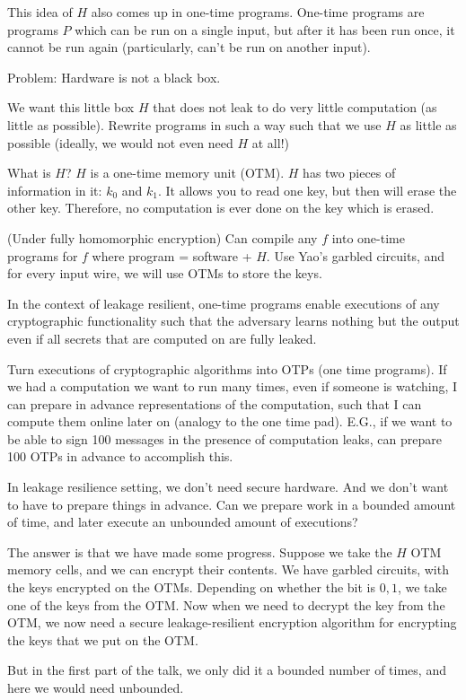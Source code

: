 \documentclass[10pt]{article}
\begin{document}
This idea of $H$ also comes up in one-time programs. One-time programs are programs $P$ which can be run on a single input, but after it has been run once, it cannot be run again (particularly, can't be run on another input).

Problem: Hardware is not a black box.

We want this little box $H$ that does not leak to do very little computation (as little as possible). Rewrite programs in such a way such that we use $H$ as little as possible (ideally, we would not even need $H$ at all!)

What is $H$? $H$ is a one-time memory unit (OTM). $H$ has two pieces of information in it: $k_0$ and $k_1$. It allows you to read one key, but then will erase the other key. Therefore, no computation is ever done on the key which is erased.

\begin{theorem}
(Under fully homomorphic encryption) Can compile any $f$ into one-time programs for $f$ where program = software + $H$. Use Yao's garbled circuits, and for every input wire, we will use OTMs to store the keys.
\end{theorem}

In the context of leakage resilient, one-time programs enable executions of any cryptographic functionality such that the adversary learns nothing but the output even if all secrets that are computed on are fully leaked.

Turn executions of cryptographic algorithms into OTPs (one time programs). If we had a computation we want to run many times, even if someone is watching, I can prepare in advance representations of the computation, such that I can compute them online later on (analogy to the one time pad). E.G., if we want to be able to sign 100 messages in the presence of computation leaks, can prepare 100 OTPs in advance to accomplish this.

In leakage resilience setting, we don't need secure hardware. And we don't want to have to prepare things in advance. Can we prepare work in a bounded amount of time, and later execute an unbounded amount of executions?

The answer is that we have made some progress. Suppose we take the $H$ OTM memory cells, and we can encrypt their contents. We have garbled circuits, with the keys encrypted on the OTMs. Depending on whether the bit is $0, 1$, we take one of the keys from the OTM. Now when we need to decrypt the key from the OTM, we now need a secure leakage-resilient encryption algorithm for encrypting the keys that we put on the OTM.

But in the first part of the talk, we only did it a bounded number of times, and here we would need unbounded.


\nocite{*}


\end{document}
